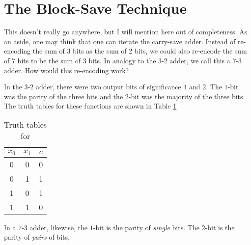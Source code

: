 \section{The Block-Save Technique}

This doesn't really go anywhere, but I will mention here out of
completeness.
As an aside, one may think that one can iterate the carry-save
adder. Instead of re-encoding the sum of 3 bits as the sum of
2 bits, we could also re-encode the sum of 7 bits to be the
sum of 3 bits. In analogy to the 3-2 adder, we call this a 7-3 adder.
How would this re-encoding work?

In the 3-2 adder, there were two output bits of significance $1$
and $2$. The $1$-bit was the parity of the three bits and
the $2$-bit was the majority of the three bits. The truth tables
for these functions are shown in Table \ref{tab:3-2}

\begin{table}
\begin{tabular}{cc|c}
\hline
$x_0$ & $x_1$ & $c$ \\
\hline
0 & 0 & 0 \\
0 & 1 & 1 \\
1 & 0 & 1 \\
1 & 1 & 0 \\
\hline
\end{tabular}
\caption{Truth tables for}
\label{tab:3-2}
\end{table}

 In a 7-3 adder,
likewise, the $1$-bit is the parity of \emph{single} bits.
The $2$-bit is the parity of \emph{pairs} of bits, 
